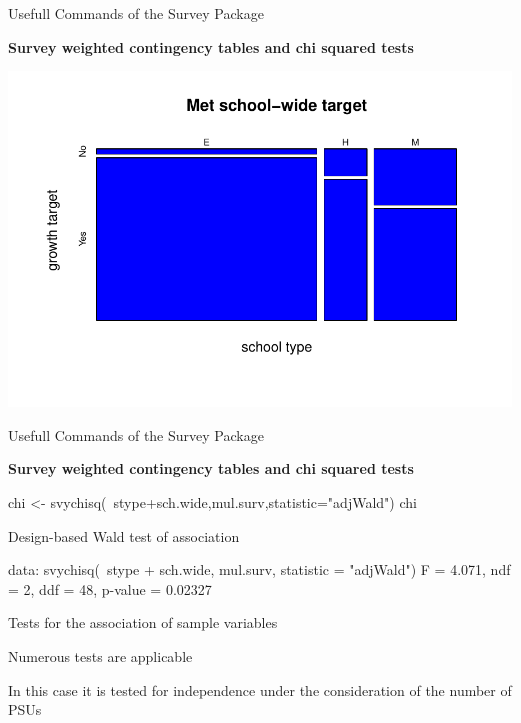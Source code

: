 \documentclass[11pt,german,hideothersubsections]{beamer}
\begin{document}
\begin{frame}[fragile]{Usefull Commands} {of the Survey Package}
\footnotesize{
\begin{center}
\textbf{Survey weighted contingency tables and chi squared tests}
\end{center}

\includegraphics{Day4-009}

}
\end{frame}
\begin{frame}[fragile]{Usefull Commands} {of the Survey Package}
\footnotesize{
\begin{center}
\textbf{Survey weighted contingency tables and chi squared tests}
\end{center}
\vspace{.25cm}
\begin{Schunk}
\begin{Sinput}
 chi <- svychisq(~stype+sch.wide,mul.surv,statistic="adjWald")
 chi
\end{Sinput}
\begin{Soutput}
	Design-based Wald test of association

data:  svychisq(~stype + sch.wide, mul.surv, statistic = "adjWald")
F = 4.071, ndf = 2, ddf = 48, p-value = 0.02327
\end{Soutput}
\end{Schunk}
}

\begin{itemize}\footnotesize{
\item Tests for the association of sample variables
\item Numerous tests are applicable
\item In this case it is tested for independence under the consideration of the number of PSUs}
\end{itemize}
\end{frame}
\end{document}
